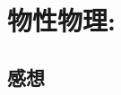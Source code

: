 \documentclass[../ap_2012.tex]{subfiles}
\begin{document}
\setcounter{chapter}{3}
\chapter{物性物理:}

\section*{感想}
\end{document}
